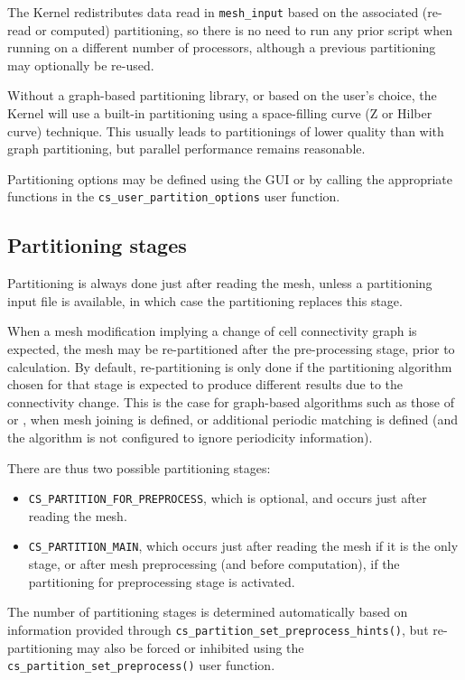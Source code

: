 {{The Kernel redistributes data read in {\tt mesh\_input} based on the associated
(re-read or computed) partitioning, so there is no need to run any
prior script when running on a different number of processors, although
a previous partitioning may optionally be re-used.

Without a graph-based partitioning library, or based on the user's choice,
the Kernel will use a built-in partitioning using a space-filling curve
(Z or Hilber curve) technique. This usually leads to partitionings
of lower quality than with graph partitioning, but parallel
performance remains reasonable.

Partitioning options may be defined using the GUI or by calling
the appropriate functions in the
\texttt{cs\_user\_partition\_options} user function.

\subsection{Partitioning stages\label{sec:parall:part:stages}}

Partitioning is always done just after reading the mesh, unless a
partitioning input file is available, in which case the partitioning
replaces this stage.

When a mesh modification implying a change of cell connectivity graph
is expected, the mesh may be re-partitioned after the pre-processing
stage, prior to calculation. By default, re-partitioning is only done
if the partitioning algorithm chosen for that stage is expected to
produce different results due to the connectivity change. This is
the case for graph-based algorithms such as those of \metis or \scotch,
when mesh joining is defined, or additional periodic matching is defined
(and the algorithm is not configured to ignore periodicity information).

There are thus two possible partitioning stages:

\begin{itemize}
\item \texttt{CS\_PARTITION\_FOR\_PREPROCESS}, which is optional, and
      occurs just  after reading the mesh.
\item \texttt{CS\_PARTITION\_MAIN}, which occurs just after reading the
      mesh if it is the only stage, or after mesh preprocessing (and
      before computation), if the partitioning for preprocessing stage
      is activated.
\end{itemize}

The number of partitioning stages is determined automatically based on
information provided through \texttt{cs\_partition\_set\_preprocess\_hints()},
but re-partitioning may also be forced or inhibited using the
\texttt{cs\_partition\_set\_preprocess()} user function.

}}
